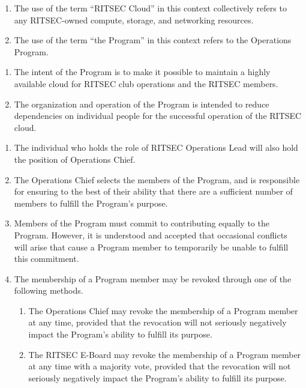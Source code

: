 

\begin{enumerate}
	\item The use of the term ``RITSEC Cloud'' in this context collectively refers to any
	      RITSEC-owned compute, storage, and networking resources.
	\item The use of the term ``the Program'' in this context refers to the Operations
	      Program.
\end{enumerate}


\begin{enumerate}
	\item The intent of the Program is to make it possible to maintain a highly available
	      cloud for RITSEC club operations and the RITSEC members.
	\item The organization and operation of the Program is intended to reduce
	      dependencies on individual people for the successful operation of the RITSEC
	      cloud.
\end{enumerate}


\begin{enumerate}
	\item The individual who holds the role of RITSEC Operations Lead will also hold the
	      position of Operations Chief.
	\item The Operations Chief selects the members of the Program, and is responsible for
	      ensuring to the best of their ability that there are a sufficient number of
	      members to fulfill the Program's purpose.
	\item Members of the Program must commit to contributing equally to the Program.
	      However, it is understood and accepted that occasional conflicts will arise
	      that cause a Program member to temporarily be unable to fulfill this
	      commitment.
	\item The membership of a Program member may be revoked through one of the following
	      methods.
	      \begin{enumerate}
		      \item The Operations Chief may revoke the membership of a Program member at any time,
		            provided that the revocation will not seriously negatively impact the Program's
		            ability to fulfill its purpose.
		      \item The RITSEC E-Board may revoke the membership of a Program member at any time
		            with a majority vote, provided that the revocation will not seriously
		            negatively impact the Program's ability to fulfill its purpose.
	      \end{enumerate}
\end{enumerate}

